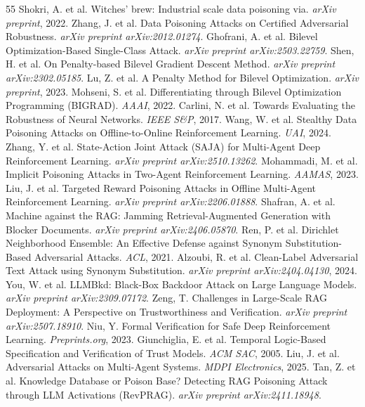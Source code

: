 \documentclass[conference]{IEEEtran}
\begin{document}
\begin{thebibliography}{55}
 Shokri, A. et al. Witches' brew: Industrial scale data poisoning via. \emph{arXiv preprint}, 2022.
 Zhang, J. et al. Data Poisoning Attacks on Certified Adversarial Robustness. \emph{arXiv preprint arXiv:2012.01274}.
 Ghofrani, A. et al. Bilevel Optimization-Based Single-Class Attack. \emph{arXiv preprint arXiv:2503.22759}.
 Shen, H. et al. On Penalty-based Bilevel Gradient Descent Method. \emph{arXiv preprint arXiv:2302.05185}.
 Lu, Z. et al. A Penalty Method for Bilevel Optimization. \emph{arXiv preprint}, 2023.
 Mohseni, S. et al. Differentiating through Bilevel Optimization Programming (BIGRAD). \emph{AAAI}, 2022.
 Carlini, N. et al. Towards Evaluating the Robustness of Neural Networks. \emph{IEEE S\&P}, 2017.
 Wang, W. et al. Stealthy Data Poisoning Attacks on Offline-to-Online Reinforcement Learning. \emph{UAI}, 2024.
 Zhang, Y. et al. State-Action Joint Attack (SAJA) for Multi-Agent Deep Reinforcement Learning. \emph{arXiv preprint arXiv:2510.13262}.
 Mohammadi, M. et al. Implicit Poisoning Attacks in Two-Agent Reinforcement Learning. \emph{AAMAS}, 2023.
 Liu, J. et al. Targeted Reward Poisoning Attacks in Offline Multi-Agent Reinforcement Learning. \emph{arXiv preprint arXiv:2206.01888}.
 Shafran, A. et al. Machine against the RAG: Jamming Retrieval-Augmented Generation with Blocker Documents. \emph{arXiv preprint arXiv:2406.05870}.
 Ren, P. et al. Dirichlet Neighborhood Ensemble: An Effective Defense against Synonym Substitution-Based Adversarial Attacks. \emph{ACL}, 2021.
 Alzoubi, R. et al. Clean-Label Adversarial Text Attack using Synonym Substitution. \emph{arXiv preprint arXiv:2404.04130}, 2024.
 You, W. et al. LLMBkd: Black-Box Backdoor Attack on Large Language Models. \emph{arXiv preprint arXiv:2309.07172}.
 Zeng, T. Challenges in Large-Scale RAG Deployment: A Perspective on Trustworthiness and Verification. \emph{arXiv preprint arXiv:2507.18910}.
 Niu, Y. Formal Verification for Safe Deep Reinforcement Learning. \emph{Preprints.org}, 2023.
 Giunchiglia, E. et al. Temporal Logic-Based Specification and Verification of Trust Models. \emph{ACM SAC}, 2005.
 Liu, J. et al. Adversarial Attacks on Multi-Agent Systems. \emph{MDPI Electronics}, 2025.
 Tan, Z. et al. Knowledge Database or Poison Base? Detecting RAG Poisoning Attack through LLM Activations (RevPRAG). \emph{arXiv preprint arXiv:2411.18948}.

\end{thebibliography}
\end{document}
